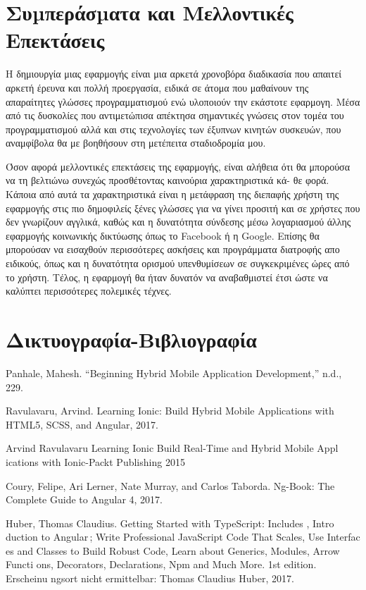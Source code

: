 \documentclass[a4paper,12pt]{article}
\begin{document}
		\clearpage
	
		\newpage
		\section{ Συµπεράσµατα και Μελλοντικές Επεκτάσεις}	

		Η δημιουργία μιας εφαρμογής είναι μια αρκετά
		χρονοβόρα διαδικασία που απαιτεί αρκετή έρευνα και πολλή προεργασία,
		ειδικά σε άτομα που μαθαίνουν της απαραίτητες γλώσσες προγραμματισμού ενώ υλοποιούν
		την εκάστοτε εφαρμογη. Μέσα από τις δυσκολίες που αντιμετώπισα απέκτησα σημαντικές γνώσεις
		στον τομέα του προγραμματισμού αλλά και στις τεχνολογίες των έξυπνων κινητών συσκευών, που αναμφίβολα
		θα με βοηθήσουν στη μετέπειτα σταδιοδρομία μου. 

		Όσον αφορά μελλοντικές επεκτάσεις της εφαρμογής, είναι αλήθεια ότι θα
		μπορούσα να τη βελτιώνω συνεχώς προσθέτοντας καινούρια χαρακτηριστικά κά-
		θε φορά. Κάποια από αυτά τα χαρακτηριστικά είναι η μετάφραση της διεπαφής χρήστη της εφαρμογής στις πιο δημοφιλείς ξένες γλώσσες για να γίνει προσιτή και σε χρήστες που δεν γνωρίζουν αγγλικά, καθώς και η δυνατότητα σύνδεσης μέσω λογαριασμού άλλης εφαρμογής κοινωνικής δικτύωσης όπως το Facebook ή η Google. Επίσης θα μπορούσαν να εισαχθούν περισσότερες ασκήσεις και προγράμματα διατροφής απο ειδικούς, όπως και η δυνατότητα
		ορισμού υπενθυμίσεων σε συγκεκριμένες ώρες από το χρήστη. Τέλος, η εφαρμογή θα ήταν δυνατόν να αναβαθμιστεί έτσι ώστε να καλύπτει περισσότερες πολεμικές τέχνες.

		\clearpage
					
		\section{Δικτυογραφία-Βιβλιογραφία}
			Panhale, Mahesh. “Beginning Hybrid Mobile Application Development,” n.d., 229.

			Ravulavaru, Arvind. Learning Ionic: Build Hybrid Mobile Applications with HTML5, SCSS, and Angular, 2017.

			Arvind Ravulavaru Learning Ionic Build Real-Time and Hybrid 
			Mobile Appl
			ications with Ionic-Packt Publishing 2015
			
			Coury, Felipe, Ari Lerner, Nate Murray, and Carlos Taborda. Ng-Book: The Complete Guide to Angular 4, 2017.

			Huber, Thomas Claudius. Getting Started with TypeScript: Includes ,
			Intro
			duction to Angular ; Write Professional JavaScript Code That Scales, Use Interfac
			es and Classes to Build Robust Code, 
			Learn about Generics, Modules, Arrow Functi
			ons, Decorators, Declarations, Npm and Much More. 1st edition. 
			Erscheinu
			ngsort nicht ermittelbar: Thomas Claudius Huber, 2017.
\end{document}
